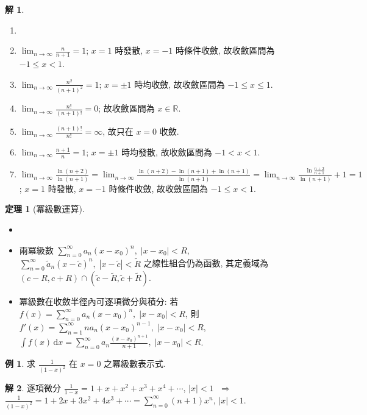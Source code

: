 \documentclass[12pt]{extarticle}
\newcommand{\ds}{\displaystyle}
\newcommand{\ie}{\;\Longrightarrow\;}
\theoremstyle{definition}
\newtheorem*{thm}{定理}
\newtheorem*{ex}{例}
\newtheorem*{sol}{解}
\begin{document}
\begin{sol}
  \begin{enumerate}\setlength{\itemsep}{0pt}
    \item[]
    \item $\ds\lim_{n\to\infty}\frac{n}{n + 1} = 1$; $x = 1$ 時發散, $x = -1$ 時條件收斂, 故收斂區間為 $-1\leqslant x < 1$. 
    \item $\ds\lim_{n\to\infty}\frac{n^2}{(n + 1)^2} = 1$; $x = \pm 1$ 時均收斂, 故收斂區間為 $-1\leqslant x\leqslant 1$. 
    \item $\ds\lim_{n\to\infty}\frac{n!}{(n + 1)!} = 0$; 故收斂區間為 $x\in\mathbb{R}$. 
    \item $\ds\lim_{n\to\infty}\frac{(n + 1)!}{n!} = \infty$,  故只在 $x = 0$ 收斂. 
    \item $\ds\lim_{n\to\infty}\frac{n + 1}{n} = 1$; $x = \pm 1$ 時均發散, 故收斂區間為 $-1 < x < 1$. 
    \item $\ds\lim_{n\to\infty}\frac{\ln(n + 2)}{\ln(n + 1)} = \lim_{n\to\infty}\frac{\ln(n + 2) - \ln(n + 1) + \ln(n + 1)}{\ln(n + 1)} = \lim_{n\to\infty}\frac{\ln\frac{n + 2}{n + 1}}{\ln(n + 1)} + 1 = 1$; $x = 1$ 時發散, $x = -1$ 時條件收斂, 故收斂區間為 $-1\leqslant x < 1$. 
  \end{enumerate}
\end{sol}

\begin{thm}[冪級數運算]
  \begin{itemize}\setlength{\itemsep}{0pt}
    \item[]
    \item 兩冪級數 $\ds\sum_{n = 0}^\infty a_n (x - x_0)^n,\;|x - x_0| < R$, $\ds\sum_{n = 0}^\infty \widetilde{a}_n (x - \widetilde{c})^n,\;|x - \widetilde{c}| < \widetilde{R}$ 之線性組合仍為函數, 其定義域為 $(c - R, c + R)\cap(\widetilde{c} - \widetilde{R}, \widetilde{c} + \widetilde{R})$. 
    \item 冪級數在收斂半徑內可逐項微分與積分: 若 $\ds f(x) = \sum_{n = 0}^\infty a_n (x - x_0)^n,\;|x - x_0| < R$, 則 $\ds f'(x) = \sum_{n = 1}^\infty n a_n (x - x_0)^{n - 1},\;|x - x_0| < R$, $\ds\int f(x)\,\text{d}x = \sum_{n = 0}^\infty a_n \frac{(x - x_0)^{n + 1}}{n + 1},\;|x - x_0| < R$. 
  \end{itemize}
\end{thm}

\begin{ex}
  求 $\ds\frac{1}{(1 - x)^2}$ 在 $x = 0$ 之冪級數表示式. 
\end{ex}

\begin{sol}
  逐項微分 $\ds\frac{1}{1 - x} = 1 + x + x^2 + x^3 + x^4 + \cdots$, $|x| < 1$ $\ie$ $\ds\frac{1}{(1 - x)^2} = 1 + 2x + 3x^2 + 4x^3 + \cdots = \sum_{n = 0}^\infty(n + 1) x^n$, $|x| < 1$. 
\end{sol}
\end{document}
